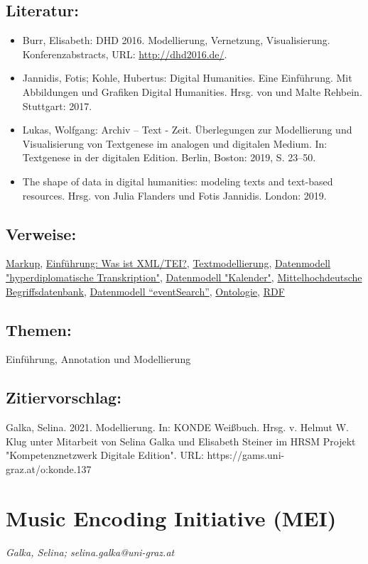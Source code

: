 \documentclass{article}
\begin{document}
        \subsection*{Literatur:}\begin{itemize}\item Burr, Elisabeth: DHD 2016. Modellierung, Vernetzung, Visualisierung.
                              Konferenzabstracts, URL: \url{http://dhd2016.de/}.\item Jannidis, Fotis; Kohle, Hubertus: Digital Humanities. Eine Einführung. Mit Abbildungen und
                              Grafiken Digital Humanities. Hrsg. von  und Malte Rehbein. Stuttgart: 2017.\item Lukas, Wolfgang: Archiv – Text - Zeit. Überlegungen zur Modellierung und
                              Visualisierung von Textgenese im analogen und digitalen Medium. In: Textgenese in der digitalen Edition. Berlin, Boston: 2019, S. 23–50.\item The shape of data in digital humanities: modeling texts
                              and text-based resources. Hrsg. von Julia Flanders und Fotis Jannidis. London: 2019.\end{itemize}\subsection*{Verweise:}\href{https://gams.uni-graz.at/o:konde.126}{Markup}, \href{https://gams.uni-graz.at/o:konde.79}{Einführung: Was ist XML/TEI?}, \href{https://gams.uni-graz.at/o:konde.195}{Textmodellierung}, \href{https://gams.uni-graz.at/o:konde.50}{Datenmodell "hyperdiplomatische
                           Transkription"}, \href{https://gams.uni-graz.at/o:konde.51}{Datenmodell "Kalender"}, \href{https://gams.uni-graz.at/o:konde.52}{Mittelhochdeutsche
                           Begriffsdatenbank}, \href{https://gams.uni-graz.at/o:konde.53}{Datenmodell “eventSearch”}, \href{https://gams.uni-graz.at/o:konde.151}{Ontologie}, \href{https://gams.uni-graz.at/o:konde.131}{RDF}\subsection*{Themen:}Einführung, Annotation und Modellierung\subsection*{Zitiervorschlag:}Galka, Selina. 2021. Modellierung. In: KONDE Weißbuch. Hrsg. v. Helmut W. Klug unter Mitarbeit von Selina Galka und Elisabeth Steiner im HRSM Projekt "Kompetenznetzwerk Digitale Edition". URL: https://gams.uni-graz.at/o:konde.137\newpage\section*{Music Encoding Initiative (MEI)} \emph{Galka, Selina; selina.galka@uni-graz.at}\\
        
\end{document}
